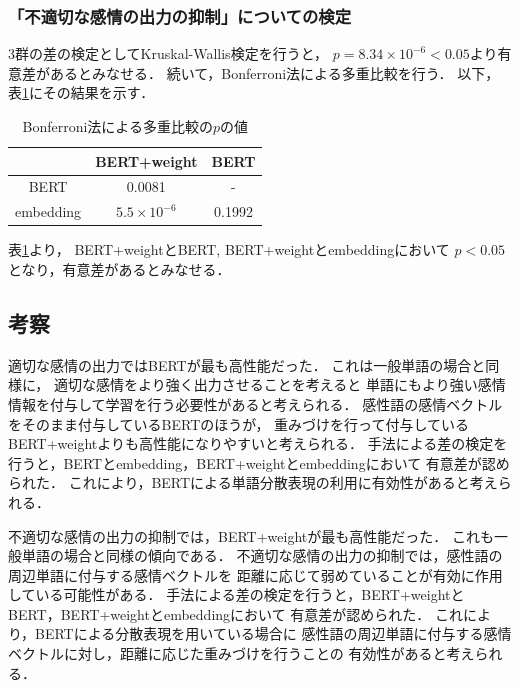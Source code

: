 	\subsubsection{「不適切な感情の出力の抑制」についての検定}
		3群の差の検定としてKruskal-Wallis検定を行うと，
		$p=8.34\times10^{-6}<0.05$より有意差があるとみなせる．
		続いて，Bonferroni法による多重比較を行う．
		以下，表\ref{table:jikken3_bad_Bonferroni}にその結果を示す．
		\begin{table}[H]
			\centering
			\caption{Bonferroni法による多重比較の$p$の値}
			\label{table:jikken3_bad_Bonferroni}
			\begin{tabular}{|c|c|c|}
				\hline
				& BERT+weight & BERT \\
				\hline
				BERT & 0.0081 & - \\
				\hline
				embedding & $ 5.5\times10^{-6} $ & 0.1992 \\
				\hline
			\end{tabular}
		\end{table}
		表\ref{table:jikken3_bad_Bonferroni}より，
		BERT+weightとBERT, BERT+weightとembeddingにおいて
		$p<0.05$となり，有意差があるとみなせる．

	\subsection{考察}
	適切な感情の出力ではBERTが最も高性能だった．
	これは一般単語の場合と同様に，
	適切な感情をより強く出力させることを考えると
	単語にもより強い感情情報を付与して学習を行う必要性があると考えられる．
	感性語の感情ベクトルをそのまま付与しているBERTのほうが，
	重みづけを行って付与しているBERT+weightよりも高性能になりやすいと考えられる．
	手法による差の検定を行うと，BERTとembedding，BERT+weightとembeddingにおいて
	有意差が認められた．
	これにより，BERTによる単語分散表現の利用に有効性があると考えられる．

	不適切な感情の出力の抑制では，BERT+weightが最も高性能だった．
	これも一般単語の場合と同様の傾向である．
	不適切な感情の出力の抑制では，感性語の周辺単語に付与する感情ベクトルを
	距離に応じて弱めていることが有効に作用している可能性がある．
	手法による差の検定を行うと，BERT+weightとBERT，BERT+weightとembeddingにおいて
	有意差が認められた．
	これにより，BERTによる分散表現を用いている場合に
	感性語の周辺単語に付与する感情ベクトルに対し，距離に応じた重みづけを行うことの
	有効性があると考えられる．
